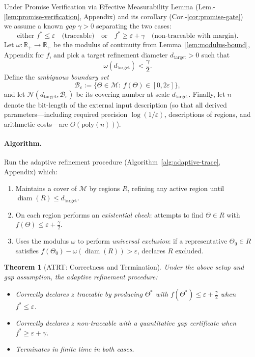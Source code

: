 \documentclass[12pt]{article}
\theoremstyle{definition}
\theoremstyle{plain}
\newtheorem{theorem}{Theorem}[section]
\begin{document}
\medskip Under Promise Verification via Effective Measurability Lemma (Lem.-\ref{lem:promise-verification}, Appendix) and its corollary (Cor.-\ref{cor:promise-gate}) we assume a known \emph{gap} \(\gamma>0\) separating the two cases:
\[
\text{either } f^* \le \varepsilon \quad\text{(traceable)} 
\quad\text{or}\quad 
f^* \ge \varepsilon+\gamma \quad\text{(non-traceable with margin).}
\]
Let \(\omega:\mathbb R_+\to\mathbb R_+\) be the modulus of continuity from Lemma~\ref{lem:modulus-bound}, Appendix for \(f\), and pick a target refinement diameter \(d_{\mathrm{target}}>0\) such that
\[
\omega(d_{\mathrm{target}}) < \frac{\gamma}{2}.
\]
Define the \emph{ambiguous boundary set}
\[
\mathcal B_{\varepsilon} := \{\Theta\in\mathcal M:\ f(\Theta)\in[0,2\varepsilon]\},
\]
and let \(\mathcal N(d_{\mathrm{target}},\mathcal B_{\varepsilon})\) be its covering number at scale \(d_{\mathrm{target}}\). Finally, let \(n\) denote the bit-length of the external input description (so that all derived parameters—including required precision \(\log(1/\varepsilon)\), descriptions of regions, and arithmetic costs—are \(O(\mathrm{poly}(n))\)).

\paragraph{Algorithm.}  
Run the adaptive refinement procedure (Algorithm~\ref{alg:adaptive-trace}, Appendix) which:
\begin{enumerate}[label=(\alph*)]
  \item Maintains a cover of \(\mathcal M\) by regions \(R\), refining any active region until \(\operatorname{diam}(R)\le d_{\mathrm{target}}\).
  \item On each region performs an \emph{existential check}: attempts to find \(\Theta\in R\) with \(f(\Theta)\le \varepsilon + \frac{\gamma}{2}\).
  \item Uses the modulus \(\omega\) to perform \emph{universal exclusion}: if a representative \(\Theta_0\in R\) satisfies \(f(\Theta_0) - \omega(\operatorname{diam}(R)) > \varepsilon\), declares \(R\) excluded.
\end{enumerate}

\begin{theorem}[ATRT: Correctness and Termination]
\label{thm:ATRT-refined-main}
Under the above setup and gap assumption, the adaptive refinement procedure:
\begin{itemize}
  \item Correctly declares \(z\) \emph{traceable} by producing \(\Theta^*\) with \(f(\Theta^*) \le \varepsilon + \frac{\gamma}{2}\) when \(f^*\le \varepsilon\).
  \item Correctly declares \(z\) \emph{non-traceable} with a quantitative gap certificate when \(f^*\ge \varepsilon+\gamma\).
  \item Terminates in finite time in both cases.
\end{itemize}
\end{theorem}
\end{document}

